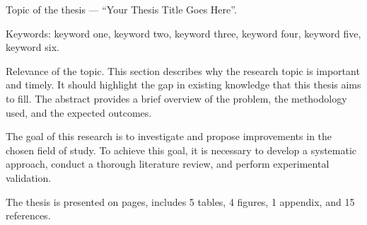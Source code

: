 
Topic of the thesis --- ``Your Thesis Title Goes Here''.

Keywords: keyword one, keyword two, keyword three, keyword four, keyword five, keyword six.

Relevance of the topic.
This section describes why the research topic is important and timely.
It should highlight the gap in existing knowledge that this thesis aims to fill.
The abstract provides a brief overview of the problem, the methodology used, and the expected outcomes.

The goal of this research is to investigate and propose improvements in the chosen field of study.
To achieve this goal, it is necessary to develop a systematic approach, conduct a thorough literature review, and perform experimental validation.

The thesis is presented on \pageref{LastPage} pages, includes 5 tables, 4 figures, 1 appendix, and 15 references.

\clearpage
